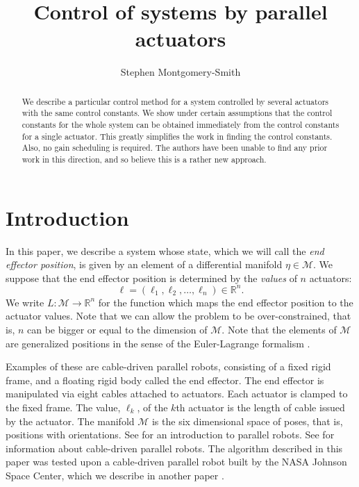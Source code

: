 \documentclass[reqno,twocolumn]{amsart}
\author{
Stephen Montgomery-Smith}
\title{Control of systems by parallel actuators}
\renewcommand{\mathsf}{}
\begin{document}

    \begin{abstract}
We describe a particular control method for a system controlled by several actuators with the same control constants.  We show under certain assumptions that the control constants for the whole system can be obtained immediately from the control constants for a single actuator.  This greatly simplifies the work in finding the control constants.  Also, no gain scheduling is required.  The authors have been unable to find any prior work in this direction, and so believe this is a rather new approach.
    \end{abstract}


    \maketitle

\section{Introduction}

In this paper, we describe a system whose state, which we will call the \emph{end effector position}, is given by an element of a differential manifold $\eta \in \mathcal M$.  We suppose that the end effector position is determined by the \emph{values} of $n$ actuators:
\begin{equation}
\bm \ell = (\ell_1, \ell_2,\dots,\ell_n) \in \mathbb R^n .
\end{equation}
We write $\mathsf L:\mathcal M \to \mathbb R^n$ for the function which maps the end effector position to the actuator values.  Note that we can allow the problem to be over-constrained, that is, $n$ can be bigger or equal to the dimension of $\mathcal M$.  Note that the elements of $\mathcal M$ are generalized positions in the sense of the Euler-Lagrange formalism \cite{arnold}.

Examples of these are cable-driven parallel robots, consisting of a fixed rigid frame, and a floating rigid body called the end effector.  The end effector is manipulated via eight cables attached to actuators.  Each actuator is clamped to the fixed frame.  The value, $\ell_k$, of the $k$th actuator is the length of cable issued by the actuator.  The manifold $\mathcal M$ is the six dimensional space of poses, that is, positions with orientations.  See \cite{gallardo-alvarado,gogu,taghirad} for an introduction to parallel robots.  See \cite{pott,qian-et-al} for information about cable-driven parallel robots.  The algorithm described in this paper was tested upon a cable-driven parallel robot built by the NASA Johnson Space Center, which we describe in another paper \cite{montgomery-smith}.
\end{document}
